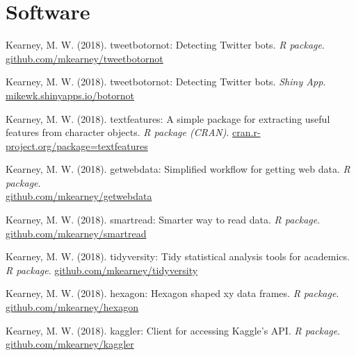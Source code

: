 \section{Software}

\begin{bibenum}

  \item Kearney, M. W. (2018).
    tweetbotornot: Detecting Twitter bots.
    \textit{R package}.
    \\ \href{https://github.com/mkearney/tweetbotornot}{github.com/mkearney/tweetbotornot}

  \item Kearney, M. W. (2018).
    tweetbotornot: Detecting Twitter bots.
    \textit{Shiny App}.
    \\ \href{https://mikewk.shinyapps.io/botornot/}{mikewk.shinyapps.io/botornot}

  \item Kearney, M. W. (2018).
    textfeatures: A simple package for extracting useful features from character objects.
    \textit{R package (CRAN)}.
    \href{http://cran.r-project.org/package=textfeatures}{cran.r-project.org/package=textfeatures}

  \item Kearney, M. W. (2018).
    getwebdata: Simplified workflow for getting web data.
    \textit{R package}.
    \\ \href{https://github.com/mkearney/getwebdata}{github.com/mkearney/getwebdata}

  \item Kearney, M. W. (2018).
    smartread: Smarter way to read data.
    \textit{R package}.
    \href{https://github.com/mkearney/smartread}{github.com/mkearney/smartread}

  \item Kearney, M. W. (2018).
    tidyversity: Tidy statistical analysis tools for academics.
    \textit{R package}.
    \href{https://github.com/mkearney/tidyversity}{github.com/mkearney/tidyversity}

  \item Kearney, M. W. (2018).
    hexagon: Hexagon shaped xy data frames.
    \textit{R package}.
    \href{https://github.com/mkearney/hexagon}{github.com/mkearney/hexagon}

  \item Kearney, M. W. (2018).
    kaggler: Client for accessing Kaggle’s API.
    \textit{R package}.
    \href{https://github.com/mkearney/kaggler}{github.com/mkearney/kaggler}


\end{bibenum}
